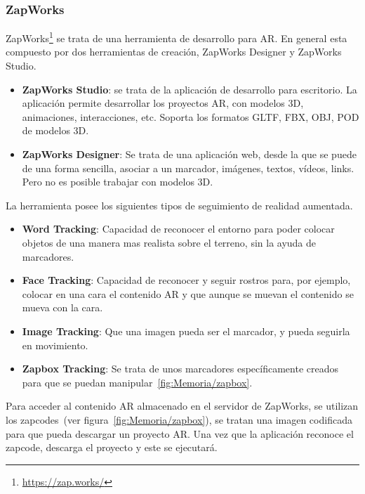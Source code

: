 \subsubsection{ZapWorks} ZapWorks\footnote{\url{https://zap.works/}} se trata de una herramienta de desarrollo para AR. En general esta compuesto por dos herramientas de creación, ZapWorks Designer y ZapWorks Studio.

\begin{itemize}
	\item \textbf{ZapWorks Studio}: se trata de la aplicación de desarrollo para escritorio. La aplicación permite desarrollar los proyectos AR, con modelos 3D, animaciones, interacciones, etc. Soporta los formatos  GLTF, FBX, OBJ, POD de modelos 3D.
	\item \textbf{ZapWorks Designer}: Se trata de una aplicación web, desde la que se puede de una forma sencilla, asociar a un marcador, imágenes, textos, vídeos, links. Pero no es posible trabajar con modelos 3D.
\end{itemize}	


La herramienta posee los siguientes tipos de seguimiento de realidad aumentada.

\begin{itemize}
	\item \textbf{Word Tracking}: Capacidad de reconocer el entorno para poder colocar objetos de una manera mas realista sobre el terreno, sin la ayuda de marcadores.
	\item \textbf{Face Tracking}: Capacidad de reconocer y seguir rostros para, por ejemplo, colocar en una cara el contenido AR y que aunque se muevan el contenido se mueva con la cara.
	\item \textbf{Image Tracking}: Que una imagen pueda ser el marcador, y pueda seguirla en movimiento.
	\item \textbf{Zapbox Tracking}: Se trata de unos marcadores específicamente creados para que se puedan manipular~\ref{fig:Memoria/zapbox}.
\end{itemize}


Para acceder al contenido AR almacenado en el servidor de ZapWorks, se utilizan los zapcodes~(ver figura~\ref{fig:Memoria/zapbox}), se tratan una imagen codificada para que pueda descargar un proyecto AR. Una vez que la aplicación reconoce el zapcode, descarga el proyecto y este se ejecutará.




